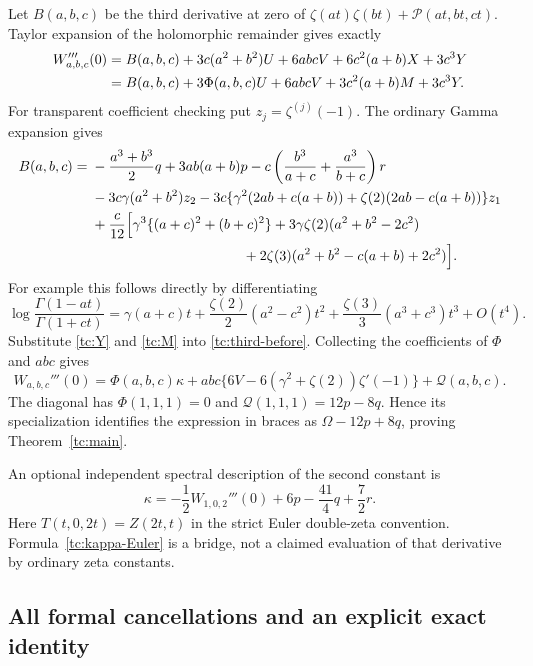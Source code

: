 Let $B(a,b,c)$ be the third derivative at zero of
$\zeta(at)\zeta(bt)+\mathscr P(at,bt,ct)$.  Taylor expansion of
the holomorphic remainder gives exactly
\begin{align}
 W_{a,b,c}'''(0)
 &=B(a,b,c)+3c(a^2+b^2)U+6abcV
                  +6c^2(a+b)X+3c^3Y\notag\\
 &=B(a,b,c)+3\Phi(a,b,c)U+6abcV
                  +3c^2(a+b)M+3c^3Y.
 \label{tc:third-before}
\end{align}
For transparent coefficient checking put $z_j=\zeta^{(j)}(-1)$.
The ordinary Gamma expansion gives
\begin{align*}
 B(a,b,c)={}&-\frac{a^3+b^3}{2}q+3ab(a+b)p
       -c\left(\frac{b^3}{a+c}+\frac{a^3}{b+c}\right)r\\
 &-3c\gamma(a^2+b^2)z_2
       -3c\{\gamma^2(2ab+c(a+b))
                         +\zeta(2)(2ab-c(a+b))\}z_1\\
 &+\frac c{12}\Bigl[
       \gamma^3\{(a+c)^2+(b+c)^2\}
       +3\gamma\zeta(2)(a^2+b^2-2c^2)\\
 &\hspace{38mm}+2\zeta(3)(a^2+b^2-c(a+b)+2c^2)\Bigr].
\end{align*}
For example this follows directly by differentiating
\[
 \log\frac{\Gamma(1-at)}{\Gamma(1+ct)}
  =\gamma(a+c)t+\frac{\zeta(2)}2(a^2-c^2)t^2
                    +\frac{\zeta(3)}3(a^3+c^3)t^3+O(t^4).
\]
Substitute \eqref{tc:Y} and \eqref{tc:M} into
\eqref{tc:third-before}.  Collecting the coefficients of
$\Phi$ and $abc$ gives
\begin{equation}
 W_{a,b,c}'''(0)
 =\Phi(a,b,c)\kappa
   +abc\{6V-6(\gamma^2+\zeta(2))\zeta'(-1)\}
   +\mathscr Q(a,b,c).
 \label{tc:third-two}
\end{equation}
The diagonal has $\Phi(1,1,1)=0$ and
$\mathscr Q(1,1,1)=12p-8q$.  Hence its specialization identifies
the expression in braces as $\Omega-12p+8q$, proving
Theorem~\ref{tc:main}.

An optional independent spectral description of the second constant is
\begin{equation}
 \kappa=-\frac12W_{1,0,2}'''(0)
                +6p-\frac{41}{4}q+\frac72r.
 \label{tc:kappa-Euler}
\end{equation}
Here $T(t,0,2t)=Z(2t,t)$ in the strict Euler double-zeta convention.
Formula~\eqref{tc:kappa-Euler} is a bridge, not a claimed evaluation
of that derivative by ordinary zeta constants.

\subsection{All formal cancellations and an explicit exact identity}

